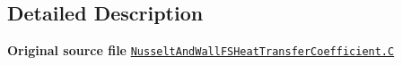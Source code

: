 \subsection{Detailed Description}
{\bfseries Original source file} \href{../../../home/carlo/data/GeN-Foam/GeN-Foam_ffn/GeN-Foam/GeN-Foam/classes/thermalHydraulics/src/physicsModels/heatTransferModels/FSHeatTransferCoefficientModels/NusseltAndWall/NusseltAndWallFSHeatTransferCoefficient.C}{\tt Nusselt\+And\+Wall\+F\+S\+Heat\+Transfer\+Coefficient.\+C} 